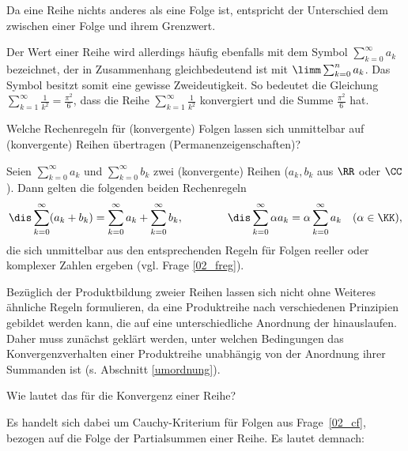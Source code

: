 \begin{antwort}
  Da eine Reihe nichts anderes als 
  eine Folge ist, entspricht der Unterschied 
  dem zwischen einer Folge und ihrem Grenzwert.

  Der Wert einer Reihe wird allerdings häufig ebenfalls mit dem Symbol 
  $\sum_{k=0}^\infty a_k$ bezeichnet, der in  Zusammenhang 
  gleichbedeutend ist mit $\limm \sum_{k=0}^n a_k$. 
  Das Symbol besitzt somit eine gewisse Zweideutigkeit. 
  So bedeutet die Gleichung $\sum_{k=1}^\infty \frac{1}{k^2} = \frac{\pi^2}{6}$, 
  dass die Reihe $\sum_{k=1}^\infty \frac{1}{k^2}$ konvergiert und die 
  Summe $\frac{\pi^2}{6}$ hat.  
  \AntEnd
\end{antwort}


\begin{frage}\label{02_regeln}
  Welche Rechenregeln für (konvergente) Folgen lassen sich unmittelbar 
  auf (konvergente) Reihen übertragen (Permanenzeigenschaften)?
\end{frage}

\begin{antwort}
  Seien $\sum_{k=0}^\infty a_k$ und $\sum_{k=0}^{\infty} b_k$ zwei 
  (konvergente) Reihen ($a_k,b_k$ aus $\RR$ oder $\CC$). 
  Dann gelten die folgenden beiden Rechenregeln
  \[
  \dis \sum_{k=0}^\infty (a_k + b_k) = \sum_{k=0}^\infty a_k 
  + \sum_{k=0}^\infty b_k, \qquad\qquad
  \dis \sum_{k=0}^\infty \alpha a_k = 
  \alpha 
  \sum_{k=0}^\infty a_k \quad( \alpha\in\KK), 
  \]
  die sich unmittelbar aus den entsprechenden Regeln für Folgen reeller 
  oder komplexer Zahlen ergeben (vgl. Frage \ref{02_freg}). 

  Bezüglich der Produktbildung zweier Reihen lassen sich nicht ohne Weiteres 
  ähnliche Regeln formulieren, da eine Produktreihe nach verschiedenen 
  Prinzipien gebildet werden kann, die auf eine unterschiedliche 
  Anordnung der hinauslaufen. Daher muss zunächst geklärt werden, 
  unter welchen Bedingungen das Konvergenzverhalten einer  
  Produktreihe unabhängig von der Anordnung ihrer Summanden ist 
  (s. Abschnitt \ref{umordnung}).\AntEnd
\end{antwort}

\begin{frage}\label{02_cauchy}
  Wie lautet das  für die Konvergenz einer Reihe? 
\end{frage}

\begin{antwort}
  Es handelt sich dabei um Cauchy-Kriterium für Folgen aus 
  Frage~\ref{02_cf}, bezogen auf die Folge der Partialsummen 
  einer Reihe. Es lautet demnach: 

  \medskip\noindent
  \AntEnd
\end{antwort}

